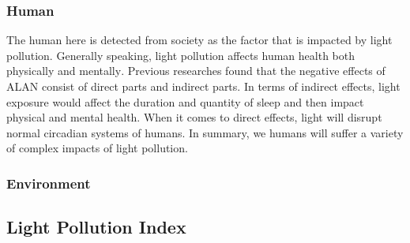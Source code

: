 \subsubsection{Human}
The human here is detected from society as the factor that is impacted by light pollution. Generally speaking, light pollution affects human health both physically and mentally\textsuperscript{\cite{ref3}}. Previous researches found that the negative effects of ALAN consist of direct parts and indirect parts. In terms of indirect effects, light exposure would affect the duration and quantity of sleep and then impact physical and mental health. When it comes to direct effects, light will disrupt normal circadian systems of humans. In summary, we humans will suffer a variety of complex impacts of light pollution.\par 


\subsubsection{Environment}


\subsection{\textbf{Light Pollution Index}}
